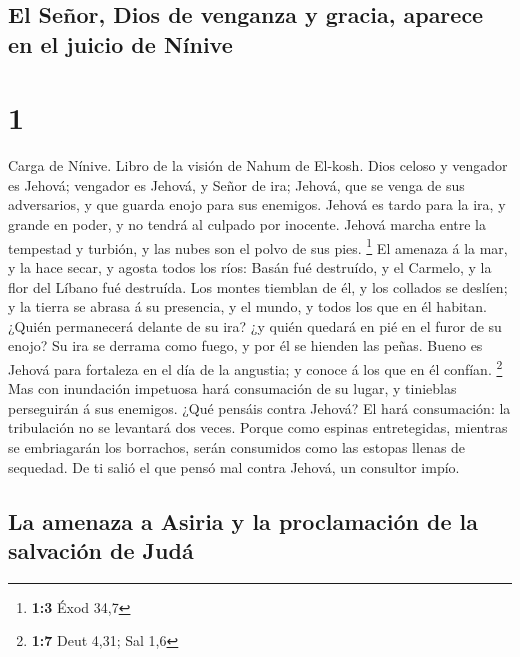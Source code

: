 \hypertarget{el-seuxf1or-dios-de-venganza-y-gracia-aparece-en-el-juicio-de-nuxednive}{%
\subsection{El Señor, Dios de venganza y gracia, aparece en el juicio de
Nínive}\label{el-seuxf1or-dios-de-venganza-y-gracia-aparece-en-el-juicio-de-nuxednive}}

\hypertarget{section}{%
\section{1}\label{section}}

 Carga de Nínive. Libro de la visión de Nahum de El-kosh.
 Dios celoso y vengador es Jehová; vengador es Jehová, y
Señor de ira; Jehová, que se venga de sus adversarios, y que guarda
enojo para sus enemigos.  Jehová es tardo para la ira, y
grande en poder, y no tendrá al culpado por inocente. Jehová marcha
entre la tempestad y turbión, y las nubes son el polvo de sus pies.
\footnote{\textbf{1:3} Éxod 34,7}  El amenaza á la mar, y la
hace secar, y agosta todos los ríos: Basán fué destruído, y el Carmelo,
y la flor del Líbano fué destruída.  Los montes tiemblan de
él, y los collados se deslíen; y la tierra se abrasa á su presencia, y
el mundo, y todos los que en él habitan.  ¿Quién permanecerá
delante de su ira? ¿y quién quedará en pié en el furor de su enojo? Su
ira se derrama como fuego, y por él se hienden las peñas. 
Bueno es Jehová para fortaleza en el día de la angustia; y conoce á los
que en él confían. \footnote{\textbf{1:7} Deut 4,31; Sal 1,6}
 Mas con inundación impetuosa hará consumación de su lugar,
y tinieblas perseguirán á sus enemigos.  ¿Qué pensáis contra
Jehová? El hará consumación: la tribulación no se levantará dos veces.
 Porque como espinas entretegidas, mientras se embriagarán
los borrachos, serán consumidos como las estopas llenas de sequedad.
 De ti salió el que pensó mal contra Jehová, un consultor
impío.

\hypertarget{la-amenaza-a-asiria-y-la-proclamaciuxf3n-de-la-salvaciuxf3n-de-juduxe1}{%
\subsection{La amenaza a Asiria y la proclamación de la salvación de
Judá}\label{la-amenaza-a-asiria-y-la-proclamaciuxf3n-de-la-salvaciuxf3n-de-juduxe1}}

